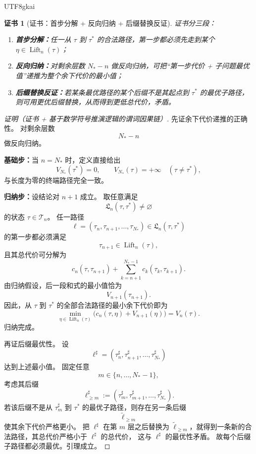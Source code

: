 \documentclass[12pt]{article}
\newtheorem{Certificate}{证书}[section]
\newcommand{\Lift}{\operatorname{Lift}}
\begin{document}
\begin{CJK*}{UTF8}{gkai}
\begin{Certificate}[证书：首步分解 + 反向归纳 + 后缀替换反证]
\label{cert:tex38-bellman}
证书分三段：
\begin{enumerate}
  \item \textbf{首步分解：}任一从 $\tau$ 到 $\tau^\ast$ 的合法路径，第一步都必须先走到某个 $\eta\in\Lift_n(\tau)$；
  \item \textbf{反向归纳：}对剩余层数 $N_\ast-n$ 做反向归纳，可把“第一步代价 + 子问题最优值”递推为整个余下代价的最小值；
  \item \textbf{后缀替换反证：}若某条最优路径的某个后缀不是其起点到 $\tau^\ast$ 的最优子路径，则可用更优后缀替换，从而得到更低总代价，矛盾。
\end{enumerate}
\end{Certificate}

\begin{proof}[证明（证书 + 基于数学符号推演逻辑的谓词因果链）]
先证余下代价递推的正确性。
对剩余层数
\[
  N_\ast-n
\]
做反向归纳。

\textbf{基础步：}当 $n=N_\ast$ 时，定义直接给出
\[
  V_{N_\ast}(\tau^\ast)=0,
  \qquad
  V_{N_\ast}(\tau)=+\infty\quad(\tau\neq\tau^\ast),
\]
与长度为零的终端路径完全一致。

\textbf{归纳步：}设结论对 $n+1$ 成立。
取任意满足
\[
  \mathfrak L_n(\tau,\tau^\ast)\neq\varnothing
\]
的状态 $\tau\in\mathcal T_n$。
任一路径
\[
  \ell=(\tau_n,\tau_{n+1},\dots,\tau_{N_\ast})\in\mathfrak L_n(\tau,\tau^\ast)
\]
的第一步都必须满足
\[
  \tau_{n+1}\in\Lift_n(\tau),
\]
且其总代价可分解为
\[
  c_n(\tau,\tau_{n+1})
  +
  \sum_{k=n+1}^{N_\ast-1}c_k(\tau_k,\tau_{k+1}).
\]
由归纳假设，后一段和式的最小值恰为
\[
  V_{n+1}(\tau_{n+1}).
\]
因此，从 $\tau$ 到 $\tau^\ast$ 的全部合法路径的最小余下代价即为
\[
  \min_{\eta\in\Lift_n(\tau)}
  \bigl(
    c_n(\tau,\eta)+V_{n+1}(\eta)
  \bigr)
  =
  V_n(\tau).
\]
归纳完成。

再证后缀最优性。
设
\[
  \ell^\sharp=(\tau_n^\sharp,\tau_{n+1}^\sharp,\dots,\tau_{N_\ast}^\sharp)
\]
达到上述最小值。
固定任意
\[
  m\in\{n,\dots,N_\ast-1\},
\]
考虑其后缀
\[
  \ell^\sharp_{\ge m}
  :=
  (\tau_m^\sharp,\tau_{m+1}^\sharp,\dots,\tau_{N_\ast}^\sharp).
\]
若该后缀不是从 $\tau_m^\sharp$ 到 $\tau^\ast$ 的最优子路径，则存在另一条后缀
\[
  \widetilde\ell_{\ge m}
\]
使其余下代价严格更小。
把 $\ell^\sharp$ 在第 $m$ 层之后替换为 $\widetilde\ell_{\ge m}$，就得到一条新的合法路径，其总代价严格小于 $\ell^\sharp$ 的总代价，
这与 $\ell^\sharp$ 的最优性矛盾。
故每个后缀子路径都必须最优。引理成立。
\end{proof}


\end{CJK*}
\end{document}
